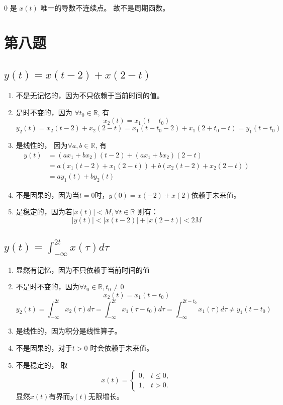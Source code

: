 \documentclass[UTF8, fontset=fandol,12pt, a4paper]{ctexart}
\begin{document}
0 是 $x(t)$ 唯一的导数不连续点。 故不是周期函数。

\section* {第八题}

\subsection{$y(t) = x(t-2) + x(2-t)$}

\begin{enumerate}
  \item 不是无记忆的，因为不只依赖于当前时间的值。
  \item 是时不变的，因为 $\forall t_0 \in \mathbb{R}$, 有
        $$x_2(t) = x_1(t - t_0)$$
        $$y_2(t) = x_2(t - 2) + x_2(2 - t) = x_1(t - t_0 - 2) + x_1(2 + t_0 - t) = y_1(t - t_0)$$
  \item 是线性的， 因为$\forall a, b \in \mathbb{R}$, 有
        \begin{align}
          y(t) &= (ax_1+bx_2)(t-2) + (ax_1+bx_2)(2-t) \\
               &= a(x_1(t-2) + x_1(2-t)) + b(x_2(t-2)+x_2(2-t)) \\
               &= ay_1(t)+by_2(t)
        \end{align}
  \item 不是因果的，因为当$t=0$时，$y(0)=x(-2)+x(2)$依赖于未来值。
  \item 是稳定的，因为若$\lvert x(t) \rvert < M, \forall t \in \mathbb{R}$ 则有：
        $$\lvert y(t) \rvert < \lvert x(t-2) \rvert + \lvert x(2-t) \rvert < 2M$$
\end{enumerate}

\subsection{$y(t)=\int_{-\infty}^{2t}x(\tau)d\tau$}
\begin{enumerate}
  \item 显然有记忆，因为不只依赖于当前时间的值
  \item 不是时不变的，因为$\forall t_0 \in \mathbb{R}, t_0 \ne 0$
        $$x_2(t) = x_1(t - t_0)$$
        $$y_2(t) = \int_{-\infty}^{2t}x_2(\tau)d\tau = \int_{-\infty}^{2t}x_1(\tau - t_0)d\tau = \int_{-\infty}^{2t - t_0} x_1(\tau) d\tau \ne y_1(t-t_0) $$
  \item 是线性的，因为积分是线性算子。
  \item 不是因果的，对于$t>0$ 时会依赖于未来值。
  \item 不是稳定的， 取 
        \[
          x(t) = \begin{cases}
            0, & t \le 0, \\
            1, & t > 0.
          \end{cases}
        \]
        显然$x(t)$有界而$y(t)$无限增长。
\end{enumerate}
\end{document}
